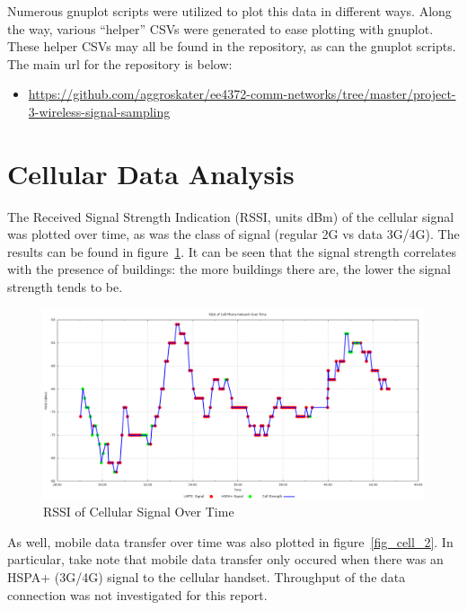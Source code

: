\documentclass[journal,twocolumn]{IEEEtran}
\begin{document}
Numerous gnuplot scripts were utilized to plot this data in different ways. 
Along the way, various ``helper'' CSVs were generated to ease plotting with 
gnuplot. These helper CSVs may all be found in the repository, as can  the 
gnuplot scripts. The main url for the repository is below:

\begin{itemize}
\item
\url{https://github.com/aggroskater/ee4372-comm-networks/tree/master/project-3-wireless-signal-sampling}
\end{itemize}

\section{Cellular Data Analysis}

The Received Signal Strength Indication (RSSI, units dBm) of the cellular 
signal was plotted over time, as was the class of signal (regular 2G vs data 
3G/4G). The results can be found in figure~\ref{fig_cell_1}. It can be seen 
that the signal strength correlates with the presence of buildings: the more 
buildings there are, the lower the signal strength tends to be.

\begin{figure}
\begin{center}
\includegraphics[scale=0.3]{cell-data/cell.png}
\caption{RSSI of Cellular Signal Over Time}
\label{fig_cell_1}
\end{center}
\end{figure}

As well, mobile data transfer over time was also plotted in
figure~\ref{fig_cell_2}. In particular, take note that mobile data transfer
only occured when there was an HSPA+ (3G/4G) signal to the cellular handset.
Throughput of the data connection was not investigated for this report.
\end{document}
